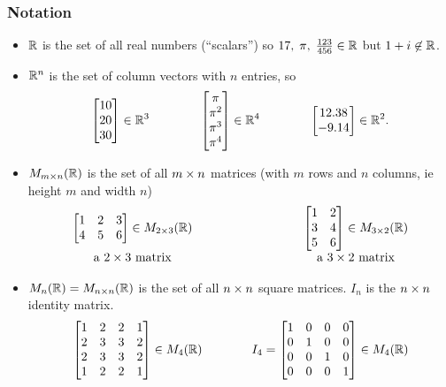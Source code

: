 \documentclass[9pt]{beamer}
\begin{document}
\begin{frame}
 \frametitle{Notation}
 \begin{itemize}
  \item<1-> ${\mathbb{R}}$ is the set of all real numbers (``scalars'') 
   so $17,\;\pi,\;\frac{123}{456}\in{\mathbb{R}}$ but $1+i\not\in{\mathbb{R}}$.
  \item<2-> ${\mathbb{R}}^n$ is the set of column vectors with $n$ entries, so
   \[ \left[\begin{matrix} 10 \\ 20 \\ 30 \end{matrix}\right] \in {\mathbb{R}}^3
       \hspace{4em}
      \left[\begin{matrix} \pi \\ \pi^2 \\ \pi^3 \\ \pi^4 \end{matrix}\right] \in {\mathbb{R}}^4
       \hspace{4em}
      \left[\begin{matrix} 12.38 \\ -9.14 \end{matrix}\right] \in {\mathbb{R}}^2.
   \]
  \item<3-> $M_{m\times n}({\mathbb{R}})$ is the set of all $m\times n$ matrices 
   (with $m$ rows and $n$ columns, ie height $m$ and width $n$)
   \[ 
     \begin{array}{ccc} 
      \left[\begin{matrix} 1 & 2 & 3 \\ 4 & 5 & 6 \end{matrix}\right] \in M_{2\times 3}({\mathbb{R}})&
      \hspace{7em} &
      \left[\begin{matrix} 1 & 2 \\ 3 & 4 \\ 5 & 6 \end{matrix}\right] \in M_{3\times 2}({\mathbb{R}})\\
      \text{ a $2\times 3$ matrix } & & 
      \text{ a $3\times 2$ matrix }
     \end{array}
   \]
  \item<4-> $M_n({\mathbb{R}})=M_{n\times n}({\mathbb{R}})$ is the set of all $n\times n$ square
   matrices.  $I_n$ is the $n\times n$ identity matrix.
   \[ \left[\begin{matrix} 1 & 2 & 2 & 1 \\ 2 & 3 & 3 & 2 \\
           2 & 3 & 3 & 2 \\ 1 & 2 & 2 & 1 \end{matrix}\right] \in M_4({\mathbb{R}}) 
      \hspace{4em}
      I_4 = \left[\begin{matrix} 1 & 0 & 0 & 0 \\ 0 & 1 & 0 & 0 \\
                 0 & 0 & 1 & 0 \\ 0 & 0 & 0 & 1 \end{matrix}\right] \in M_4({\mathbb{R}})
   \]
 \end{itemize}
\end{frame}
\end{document}
